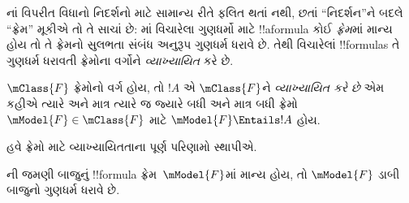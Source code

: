 \documentclass[../../../include/open-logic-section]{subfiles}
\begin{document}


નાં વિપરીત વિધાનો
નિદર્શનો માટે સામાન્ય રીતે ફલિત થતાં નથી, છતાં ``નિદર્શન''ને બદલે
``ફ્રેમ'' મૂકીએ તો તે સાચાં છે: માં
વિચારેલા ગુણધર્મો માટે !!a{formula} કોઈ \emph{ફ્રેમ}માં
માન્ય હોય તો તે ફ્રેમનો સુલભતા સંબંધ અનુરૂપ
ગુણધર્મ ધરાવે છે. તેથી વિચારેલાં !!{formula}s તે
ગુણધર્મ ધરાવતી ફ્રેમોના વર્ગોને \emph{વ્યાખ્યાયિત}
કરે છે.

\begin{defn}
  $\mClass{F}$ ફ્રેમોનો વર્ગ હોય, તો $!A$ એ
  $\mClass{F}$ને \emph{વ્યાખ્યાયિત કરે છે} એમ કહીએ
  ત્યારે અને માત્ર ત્યારે જ જ્યારે બધી અને માત્ર
  બધી ફ્રેમો~$\mModel{F} \in \mClass{F}$ માટે
  $\mModel{F} \Entails !A$ હોય.
\end{defn}

હવે ફ્રેમો માટે વ્યાખ્યાયિતતાના પૂર્ણ પરિણામો
સ્થાપીએ.

\begin{thm}
ની જમણી બાજુનું !!{formula}
ફ્રેમ~$\mModel{F}$માં માન્ય હોય, તો $\mModel{F}$
ડાબી બાજુનો ગુણધર્મ ધરાવે છે.
\end{thm}
\end{document}
